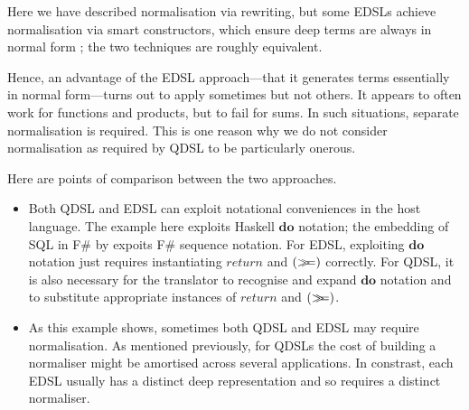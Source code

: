 \documentclass[authoryear,9pt]{sigplanconf}
\newcommand{\Varid}[1]{\mathit{#1}}
\newcommand{\bind}{\mathbin{>\!\!\!>\mkern-6.7mu=}}
\begin{document}
Here we have described normalisation via rewriting, but some EDSLs
achieve normalisation via smart constructors,
which ensure deep terms are always in normal form
\citep{rompf2012lightweight}; the two techniques are roughly equivalent.


Hence, an advantage of the EDSL approach---that it generates terms
essentially in normal form---turns out to apply sometimes but not
others. It appears to often work for functions and products, but to
fail for sums.  In such situations, separate normalisation is
required. This is one reason why we do not consider normalisation as
required by QDSL to be particularly onerous.

Here are points of comparison between the two approaches.
\begin{itemize}

\item Both QDSL and EDSL can exploit notational conveniences in the
host language. The example here exploits Haskell \ensuremath{\mathbf{do}} notation; the
embedding of SQL in F\# by \citet{cheney:linq} expoits F\# sequence
notation. For EDSL, exploiting \ensuremath{\mathbf{do}} notation just requires
instantiating \ensuremath{\Varid{return}} and \ensuremath{(\bind )} correctly. For QDSL, it is
also necessary for the translator to recognise and expand
\ensuremath{\mathbf{do}} notation and to substitute appropriate instances of
\ensuremath{\Varid{return}} and \ensuremath{(\bind )}.

\item As this example shows, sometimes both QDSL and EDSL may require
normalisation.  As mentioned previously, for QDSLs the cost of
building a normaliser might be amortised across several applications.
In constrast, each EDSL usually has a distinct deep representation and
so requires a distinct normaliser.

\end{itemize}
\end{document}
